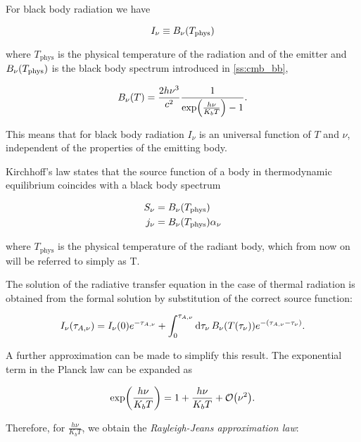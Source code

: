 For black body radiation we have

\begin{equation}
        I_\nu \equiv B_\nu\qty(T_\text{phys})
\end{equation}

where $T_\text{phys}$ is the physical temperature of the radiation and of the
emitter and $B_\nu\qty(T_\text{phys})$ is the black body spectrum introduced
in \autoref{ss:cmb_bb},

\begin{equation}
        B_\nu\qty(T) = \frac{2h\nu^3}{c^2}
        \frac{1}{\exp(\frac{h\nu}{K_b T}) - 1}.
\end{equation}

This means that for black body radiation $I_\nu$ is an universal function
of $T$ and $\nu$, independent of the properties of the emitting body.

Kirchhoff's law states that the source function of a body in thermodynamic
equilibrium coincides with a black body spectrum

\begin{align}
        S_\nu & = B_\nu\qty(T_\text{phys}) \\
        j_\nu & = B_\nu\qty(T_\text{phys}) \alpha_\nu
\end{align}

where $T_\text{phys}$ is the physical temperature of the radiant body,
which from now on will be referred to simply as T.

The solution of the radiative transfer equation in the case of thermal
radiation is obtained from the formal solution by substitution of the
correct source function:

\begin{equation}
        I_\nu\qty(\tau_{A,\nu}) = I_\nu\qty(0) e^{-\tau_{A,\nu}} +
        \int^{\tau_{A,\nu}}_0 \dd{\tau_\nu} B_\nu\qty(T\qty(\tau_\nu))
        e^{-\qty(\tau_{A,\nu} - \tau_\nu)}.
        \label{eq:radiative_thermal}
\end{equation}

A further approximation can be made to simplify this result.
The exponential term in the Planck law can be expanded as

\begin{equation}
       \exp(\frac{h\nu}{K_b T}) = 1 + \frac{h\nu}{K_b T} + \order{\nu^2}.
\end{equation}

Therefore, for $\frac{h \nu}{K_b T}$, we obtain the \emph{Rayleigh-Jeans
approximation law}:

